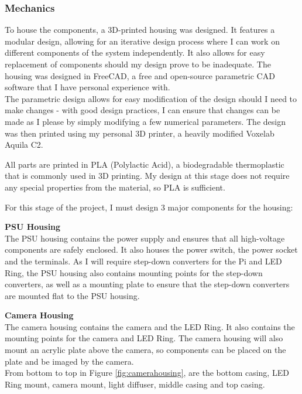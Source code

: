 \subsubsection{Mechanics} \label{sec:mechanics}
To house the components, a 3D-printed housing was designed. It features a modular design, allowing for an iterative design process
where I can work on different components of the system independently. It also allows for easy replacement of components
should my design prove to be inadequate. The housing was designed in FreeCAD\cite{freecad}, a free and open-source parametric CAD software 
that I have personal experience with. \\
The parametric design allows for easy modification of the design should I need to make changes -
with good design practices, I can ensure that changes can be made as I please by simply modifying a few numerical parameters.
The design was then printed using my personal 3D printer, a heavily modified Voxelab Aquila C2. 

All parts are printed in PLA (Polylactic Acid), a biodegradable thermoplastic that is commonly used in 3D printing. My design
at this stage does not require any special properties from the material, so PLA is sufficient.

For this stage of the project, I must design 3 major components for the housing:

\noindent
\textbf{PSU Housing} \\
The PSU housing contains the power supply and ensures that all high-voltage components are safely enclosed.
It also houses the power switch, the power socket and the terminals. As I will require step-down converters for the Pi and LED Ring,
the PSU housing also contains mounting points for the step-down converters, as well as a mounting plate to ensure that the step-down converters
are mounted flat to the PSU housing.

\noindent
\textbf{Camera Housing}
\label{sec:camerahousing} \\
The camera housing contains the camera and the LED Ring. It also contains the mounting points for the camera and LED Ring.
The camera housing will also mount an acrylic plate above the camera, so components can be placed on the plate and be imaged by the camera. \\
From bottom to top in Figure \ref*{fig:camerahousing}, are the bottom casing, LED Ring mount, camera mount, light diffuser, middle casing and
top casing. \\

